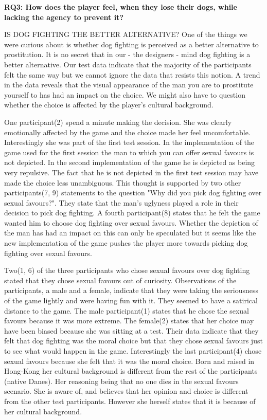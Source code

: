 \textbf{RQ3: How does the player feel, when they lose their dogs, while lacking the agency to prevent it?}








IS DOG FIGHTING THE BETTER ALTERNATIVE?
One of the things we were curious about is whether dog fighting is perceived as a better alternative to prostitution. It is no secret that in our - the designers - mind dog fighting is a better alternative. Our test data indicate that the majority of the participants felt the same way but we cannot ignore the data that resists this notion. A trend in the data reveals that the visual appearance of the man you are to prostitute yourself to has had an impact on the choice. We might also have to question whether the choice is affected by the player's cultural background.

One participant(2) spend a minute making the decision. She was clearly emotionally affected by the game and the choice made her feel uncomfortable. Interestingly she was part of the first test session. In the implementation of the game used for the first session the man to which you can offer sexual favours is not depicted. In the second implementation of the game he is depicted as being very repulsive.   The fact that he is not depicted in the first test session may have made the choice less unambiguous. This thought is supported by two other participants(7, 9) statements to the question "Why did you pick dog fighting over sexual favours?". They state that the man's uglyness played a role in their decision to pick dog fighting. A fourth participant(8) states that he felt the game wanted him to choose dog fighting over sexual favours. Whether the depiction of the man has had an impact on this can only be speculated but it seems like the new implementation of the game pushes the player more towards picking dog fighting over sexual favours.

Two(1, 6) of the three participants who chose sexual favours over dog fighting stated that they chose sexual favours out of curiosity. Observations of the participants, a male and a female, indicate that they were taking the seriousness of the game lightly and were having fun with it. They seemed to have a satirical distance to the game. The male participant(1) states that he chose the sexual favours because it was more extreme. The female(2) states that her choice may have been biased because she was sitting at a test. Their data indicate that they felt that dog fighting was the moral choice but that they chose sexual favours just to see what would happen in the game. Interestingly the last participant(4) chose sexual favours because she felt that it was the moral choice. Born and raised in Hong-Kong her cultural background is different from the rest of the participants (native Danes). Her reasoning being that no one dies in the sexual favours scenario. She is aware of, and believes that her opinion and choice is different from the other test participants. However she herself states that it is because of her cultural background.

